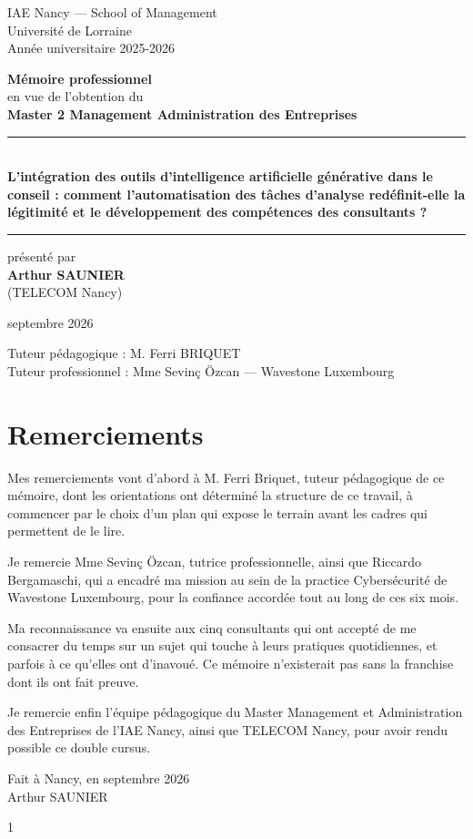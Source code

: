 \documentclass{tnreport}
\def\reportLongTitle{L'intégration des outils d'intelligence artificielle générative dans le conseil : comment l'automatisation des tâches d'analyse redéfinit-elle la légitimité et le développement des compétences des consultants ?}
\def\reportAuthor{Arthur SAUNIER}
\def\reportSupervisor{Mme Sevinç Özcan}        %
\def\reportAcademicSupervisor{M. Ferri BRIQUET}       %
\def\reportCompany{Wavestone Luxembourg}
\def\iaeSchool{IAE Nancy --- School of Management}
\def\iaeUniversity{Université de Lorraine}
\def\iaeYear{Année universitaire 2025-2026}
\def\iaeDiploma{Master 2 Management Administration des Entreprises}
\def\iaeEngSchool{TELECOM Nancy}
\def\iaeDate{septembre 2026}
\newcommand{\makeIAEtitle}{%
  \begin{titlepage}
    \thispagestyle{empty}
    \begin{center}
      {\large \iaeSchool}\\[0.3cm]
      {\large \iaeUniversity}\\[0.3cm]
      {\large \iaeYear}

      \vspace{1.2cm}

      \vfill

      {\Large \textbf{Mémoire professionnel}}\\[0.5cm]
      {\large en vue de l'obtention du}\\[0.3cm]
      {\Large \textbf{\iaeDiploma}}

      \vspace{1.6cm}
      \rule{0.85\textwidth}{0.8pt}\\[0.7cm]
      {\LARGE \textbf{\reportLongTitle}}\\[0.7cm]
      \rule{0.85\textwidth}{0.8pt}

      \vfill

      {\large présenté par}\\[0.3cm]
      {\Large \textbf{\reportAuthor}}\\[0.3cm]
      {\large (\iaeEngSchool)}

      \vspace{1.2cm}
      {\large \iaeDate}

      \vspace{1.2cm}
      \begin{minipage}{0.8\textwidth}\centering
        Tuteur pédagogique : \reportAcademicSupervisor\\
        Tuteur professionnel : \reportSupervisor{} --- \reportCompany
      \end{minipage}
    \end{center}
  \end{titlepage}
}
\begin{document}
\makeIAEtitle
{}


\section*{Remerciements}

Mes remerciements vont d'abord à M. Ferri Briquet, tuteur pédagogique de ce mémoire, dont
les orientations ont déterminé la structure de ce travail, à commencer par le choix d'un
plan qui expose le terrain avant les cadres qui permettent de le lire.
 
Je remercie Mme Sevinç Özcan, tutrice professionnelle, ainsi que Riccardo Bergamaschi, qui a
encadré ma mission au sein de la practice Cybersécurité de Wavestone Luxembourg, pour la
confiance accordée tout au long de ces six mois.
 
Ma reconnaissance va ensuite aux cinq consultants qui ont accepté de me consacrer du temps
sur un sujet qui touche à leurs pratiques quotidiennes, et parfois à ce qu'elles ont
d'inavoué. Ce mémoire n'existerait pas sans la franchise dont ils ont fait preuve.
 
Je remercie enfin l'équipe pédagogique du Master Management et Administration des
Entreprises de l'IAE Nancy, ainsi que TELECOM Nancy, pour avoir rendu possible ce double
cursus.

\vspace{2cm}
\begin{flushright}
\begin{minipage}{0.45\textwidth}
Fait à Nancy, en \iaeDate\\[2cm]
\reportAuthor
\end{minipage}
\end{flushright}


\cleardoublepage{}

\begin{spacing}{1}                   %
\small
{}              %
\tableofcontents
\end{spacing}
\cleardoublepage{}
\end{document}
